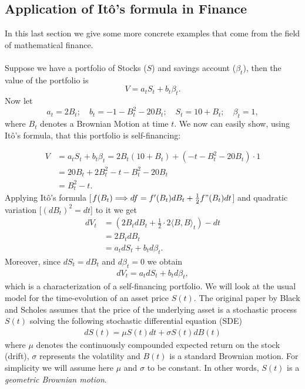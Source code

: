 \documentclass[11pt,a4paper, final]{article}
\begin{document}
\subsection{Application of Itô's formula in Finance}
In this last section we give some more concrete examples that come from the field of mathematical finance.  \\
\\
Suppose we have a portfolio of Stocks ($S$) and savings account ($\beta_t$), then the value of the portfolio is
$$ V=a_t S_t + b_t \beta_t. $$
Now let $$a_t=2 B_t;\quad b_t=-1-B_t^2-20 B_t;\quad S_t=10+B_t;\quad \beta_t=1,$$
where $B_t$ denotes a Brownian Motion at time $t$.
We now can easily show, using Itô's formula, that this portfolio is self-financing:

\begin{align*} V&=a_t S_t + b_t \beta_t = 2 B_t(10+B_t) +(-t-B_t^2-20B_t)\cdot 1\\
&=20B_t + 2B_t^2-t-B_t^2-20B_t \\
&=B_t^2-t. 
\end{align*}
Applying Itô's formula [$f(B_t) \Longrightarrow df=f'(B_t)dB_t + \frac{1}{2} f"(B_t)dt$] and quadratic variation [$(dB_t)^2=dt$] to it we get
\begin{align*}  dV_t &= (2B_t dB_t + \frac{1}{2}\cdot 2 \langle B, B \rangle_t)-dt\\
&= 2 B_t dB_t\\
&= a_t dS_t + b_t d\beta_t.
\end{align*}
Moreover, since $dS_t = dB_t$ and $d\beta_t=0$ we obtain
\begin{align*}
dV_t = a_t dS_t + b_t d\beta_t, 
\end{align*}
which is a characterization of a self-financing portfolio.
\newpage
\noindent We will look at the usual model for the time-evolution of an asset price $S(t)$.
The original paper by Black and Scholes assumes that the price of the underlying asset is a stochastic process $S(t)$ solving the following stochastic differential equation (SDE)
\begin{align*}
dS(t)=\mu S(t) dt + \sigma S(t) dB(t)
\end{align*}
where $\mu$ denotes the continuously compounded expected return on the stock (drift), $\sigma$ represents the volatility and $B(t)$ is a standard Brownian motion. For simplicity we will assume here $\mu$ and $\sigma$ to be constant. 
In other words, $S(t)$ is a \textit{geometric Brownian motion}.\\
\\
\end{document}
